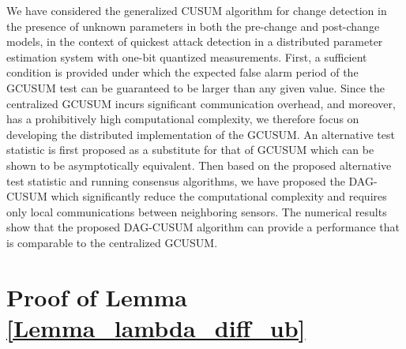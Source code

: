 \documentclass[11pt, draftclsnofoot, onecolumn]{IEEEtran}
\begin{document}
  We have considered the generalized CUSUM algorithm for change detection in  the presence of unknown parameters in both the pre-change and post-change models, in the context of quickest attack detection in a distributed parameter estimation system with one-bit quantized measurements. 
First, a sufficient condition is provided under which the expected false alarm period of the GCUSUM test can be guaranteed to be larger than any given value.  
Since the centralized GCUSUM incurs significant communication overhead, and moreover, has a prohibitively high computational complexity, we therefore focus on developing the distributed implementation of the GCUSUM. An alternative test statistic is first proposed  as a substitute for that of GCUSUM which can be shown to be asymptotically equivalent. Then based on the proposed alternative  test statistic and running consensus algorithms, we have proposed the DAG-CUSUM which significantly  reduce the computational complexity and requires only local communications between neighboring sensors. 
The numerical results show that the proposed DAG-CUSUM algorithm can provide a performance that is comparable to the centralized  GCUSUM.
 




\appendices

\section{Proof of Lemma \ref{Lemma_lambda_diff_ub}} \label{Proof_Lemma_lambda_diff_ub}
\end{document}
